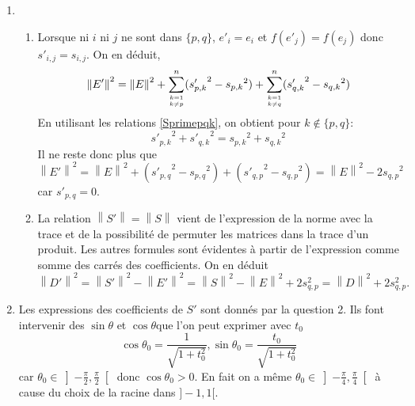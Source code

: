 \begin{enumerate}
 \item 
\begin{enumerate}
 \item Lorsque ni $i$ ni $j$ ne sont dans $\{p,q\}$, $e'_i = e_i$ et $f(e'_j) = f(e_j)$ donc $s'_{i,j} = s_{i,j}$. On en déduit,
\begin{displaymath}
\left\| E' \right\|^2 =  \left\| E \right\|^2 + \sum_{\empil{k = 1}{k\neq p}}^{n}({s'_{p,k}}^{2}-{s_{p,k}}^{2})
 + \sum_{\empil{k = 1}{k\neq q}}^{n}({s'_{q,k}}^{2}-{s_{q,k}}^{2})
\end{displaymath}
En utilisant les relations \ref{Sprimepqk}, on obtient pour $k\notin\{ p,q\}$:
\begin{displaymath}
 {s'_{p,k}}^{2} + {s'_{q,k}}^{2} = {s_{p,k}}^{2} + {s_{q,k}}^{2}
\end{displaymath}
Il ne reste donc plus que 
\begin{displaymath}
\left\| E' \right\|^2 =  \left\| E \right\|^2 
+ ({s'_{p,q}}^{2}-{s_{p,q}}^{2}) +({s'_{q,p}}^{2}-{s_{q,p}}^{2})  
= \left\| E \right\|^2 -2{s_{q,p}}^{2}
\end{displaymath}
car $s'_{p,q}=0$.
 \item La relation $\left\|S'\right\| = \left\|S \right\|$ vient de l'expression de la norme avec la trace et de la possibilité de permuter les matrices dans la trace d'un produit. Les autres formules sont évidentes à partir de l'expression comme somme des carrés des coefficients.\newline
On en déduit
\begin{displaymath}
\left\|D'\right\|^2 = \left\|S'\right\|^2 - \left\|E'\right\|^2 = \left\|S\right\|^2 - \left\|E\right\|^2 + 2 s^{2}_{q,p}
= \left\|D \right\|^2 + 2s^2_{q,p}.
\end{displaymath}

\end{enumerate}

 \item Les expressions des coefficients de $S'$ sont donnés par la question 2. Ils font intervenir des $\sin \theta$ et $\cos \theta$que l'on peut exprimer avec $t_0$
\begin{displaymath}
 \cos \theta_0 = \frac{1}{\sqrt{1+t_0^2}}, \sin \theta_0 = \frac{t_0}{\sqrt{1+t_0^2}}
\end{displaymath}
car $\theta_0 \in \left] -\frac{\pi}{2}, \frac{\pi}{2}\right[$ donc $\cos \theta_0 >0$. En fait on a même $\theta_0 \in \left] -\frac{\pi}{4}, \frac{\pi}{4}\right[$ à cause du choix de la racine dans $]-1,1[$.


\end{enumerate}
